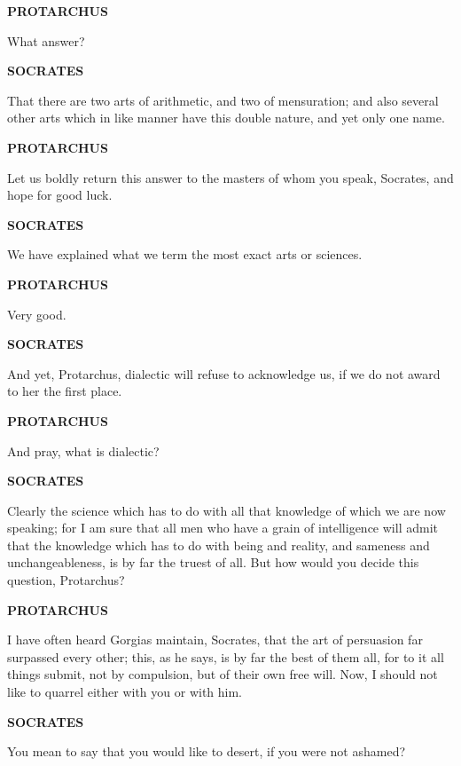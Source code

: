 \documentclass[11pt,letter]{article}
\begin{document}
\par \textbf{PROTARCHUS}
\par   What answer?

\par \textbf{SOCRATES}
\par   That there are two arts of arithmetic, and two of mensuration; and also several other arts which in like manner have this double nature, and yet only one name.

\par \textbf{PROTARCHUS}
\par   Let us boldly return this answer to the masters of whom you speak, Socrates, and hope for good luck.

\par \textbf{SOCRATES}
\par   We have explained what we term the most exact arts or sciences.

\par \textbf{PROTARCHUS}
\par   Very good.

\par \textbf{SOCRATES}
\par   And yet, Protarchus, dialectic will refuse to acknowledge us, if we do not award to her the first place.

\par \textbf{PROTARCHUS}
\par   And pray, what is dialectic?

\par \textbf{SOCRATES}
\par   Clearly the science which has to do with all that knowledge of which we are now speaking; for I am sure that all men who have a grain of intelligence will admit that the knowledge which has to do with being and reality, and sameness and unchangeableness, is by far the truest of all. But how would you decide this question, Protarchus?

\par \textbf{PROTARCHUS}
\par   I have often heard Gorgias maintain, Socrates, that the art of persuasion far surpassed every other; this, as he says, is by far the best of them all, for to it all things submit, not by compulsion, but of their own free will. Now, I should not like to quarrel either with you or with him.

\par \textbf{SOCRATES}
\par   You mean to say that you would like to desert, if you were not ashamed?
\end{document}

